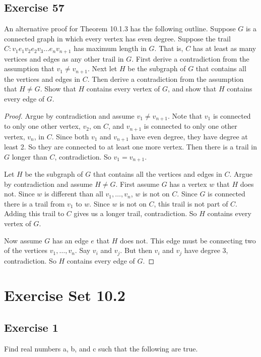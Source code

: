 \documentclass[14pt]{extarticle}
\begin{document}
\subsection{Exercise 57}
An alternative proof for Theorem 10.1.3 has the following outline. Suppose \(G\) is a connected graph in which every 
vertex has even degree. Suppose the trail \\ \(C: v_1e_1v_2e_2v_3 \ldots e_nv_{n+1}\) has maximum length in 
\(G\). That is, \(C\) has at least as many vertices and edges as any other trail in \(G\). First derive a contradiction from 
the assumption that \(v_1 \neq v_{n+1}\). Next let \(H\) be the subgraph of \(G\) that contains all the vertices and edges 
in \(C\). Then derive a contradiction from the assumption that \(H \neq G\). Show that \(H\) contains every vertex of \(G\), 
and show that \(H\) contains every edge of \(G\).

\begin{proof}
Argue by contradiction and assume \(v_1 \neq v_{n+1}\). Note that \(v_1\) is connected to only one other vertex, \(v_2\), 
on \(C\), and \(v_{n+1}\) is connected to only one other vertex, \(v_n\), in \(C\). Since both \(v_1\) and \(v_{n+1}\)
have even degree, they have degree at least 2. So they are connected to at least one more vertex. Then there is a trail 
in \(G\) longer than \(C\), contradiction. So \(v_1 = v_{n+1}\).

Let \(H\) be the subgraph of \(G\) that contains all the vertices and edges in \(C\). Argue by contradiction and assume
\(H \neq G\). First assume \(G\) has a vertex \(w\) that \(H\) does not. Since \(w\) is different than all \(v_1, \ldots, 
v_n\), \(w\) is not on \(C\). Since \(G\) is connected there is a trail from \(v_1\) to \(w\). Since \(w\) is not on \(C\), 
this trail is not part of \(C\). Adding this trail to \(C\) gives us a longer trail, contradiction. So \(H\) contains 
every vertex of \(G\). 

Now assume \(G\) has an edge \(e\) that \(H\) does not. This edge must be connecting two of the vertices \(v_1, \ldots, 
v_n\). Say \(v_i\) and \(v_j\). But then \(v_i\) and \(v_j\) have degree 3, contradiction. So \(H\) contains every edge 
of \(G\).
\end{proof}

\section{Exercise Set 10.2}
\subsection{Exercise 1}
Find real numbers a, b, and c such that the following are true.
\end{document}
